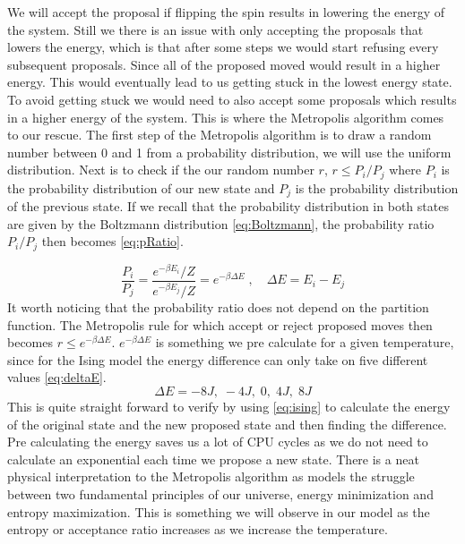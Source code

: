 We will
accept the proposal if flipping the spin results in lowering the energy of the
system. Still we there is an issue with only accepting the proposals that lowers
the energy, which is that after some steps we would start refusing every
subsequent proposals. Since all of the proposed moved would result in a higher
energy. This would eventually lead to us getting stuck in the lowest energy
state. To avoid getting stuck we would need to also accept some proposals which
results in a higher energy of the system. This is where the Metropolis
algorithm comes to our rescue. The first step of the Metropolis algorithm is to
draw a random number between 0 and 1 from a probability distribution, we will
use the uniform distribution. Next is to check if the our random number $r$,  $r \leq P_i
/P_j$ where $P_i$ is the probability distribution of our new state and $P_j$ is
the probability distribution of the previous state. If we recall that the
probability distribution in both states are given by the Boltzmann distribution
\cref{eq:Boltzmann}, the probability ratio $P_i/P_j$ then becomes \cref{eq:pRatio}.

\begin{equation}\label{eq:pRatio}
  \frac{P_i}{P_j} = \frac{e^{-\beta E_i}/Z}{e^{-\beta E_j}/Z} = e^{-\beta \Delta E} \; , \quad \Delta E = E_i - E_j
\end{equation}
It worth noticing that the probability ratio does not depend on the partition
function. The Metropolis rule for which accept or reject proposed moves then
becomes $r \leq e^{-\beta \Delta E}$.  $e^{-\beta \Delta E}$ is something we
pre calculate for a given temperature, since for the Ising
model the energy difference can only take on five different values \cref{eq:deltaE}.
\begin{equation}\label{eq:deltaE}
  \Delta E = -8J, \; -4J, \; 0, \; 4J, \; 8J
\end{equation}
This is quite straight forward to verify by using \cref{eq:ising} to calculate
the energy of the original state and the new proposed
state and then finding the difference. Pre calculating the energy saves us a lot
of CPU cycles as we do not need to calculate an exponential each time we propose
a new state. There is a neat physical interpretation to the Metropolis
algorithm as models the struggle between two fundamental principles of our
universe, energy minimization and entropy maximization. This is something we
will observe in our model as the entropy or acceptance ratio increases as we
increase the temperature.


